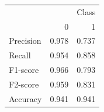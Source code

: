 \begin{tabular}{lrr}
\toprule
 & \multicolumn{2}{r}{Class} \\
 & 0 & 1 \\
\midrule
Precision & 0.978 & 0.737 \\
Recall & 0.954 & 0.858 \\
F1-score & 0.966 & 0.793 \\
F2-score & 0.959 & 0.831 \\
Accuracy & 0.941 & 0.941 \\
\bottomrule
\end{tabular}
